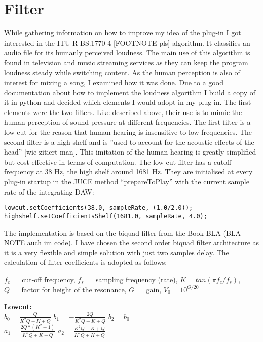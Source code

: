 \section{Filter}

While gathering information on how to improve my idea of the plug-in I got interested in the ITU-R BS.1770-4 [FOOTNOTE pls] algorithm. It classifies an audio file for its humanly perceived loudness. The main use of this algorithm is found in television and music streaming services as they can keep the program loudness steady while switching content. As the human perception is also of interest for mixing a song, I examined how it was done. Due to a good documentation about how to implement the loudness algorithm I build a copy of it in python and decided which elements I would adopt in my plug-in. The first elements were the two filters. Like described above, their use is to mimic the human perception of sound pressure at different frequencies. The first filter is a low cut for the reason that human hearing is insensitive to low frequencies. The second filter is a high shelf and is ”used to account for the acoustic effects of the head” [wie zitiert man]. This imitation of the human hearing is greatly simplified but cost effective in terms of computation. The low cut filter has a cutoff frequency at 38 Hz, the high shelf around 1681 Hz. They are initialised at every plug-in startup in the JUCE method “prepareToPlay” with the current sample rate of the integrating DAW:\\

\lstset{language=C++}
\begin{lstlisting}[frame=single]
lowcut.setCoefficients(38.0, sampleRate, (1.0/2.0));
highshelf.setCoefficientsShelf(1681.0, sampleRate, 4.0);
\end{lstlisting}

The implementation is based on the biquad filter from the Book BLA (BLA NOTE auch im code).  I have chosen the second order biquad filter architecture as it is a very flexible and simple solution with just two samples delay. The calculation of filter coefficients is adopted as follows:

$f_c = $ cut-off frequency, $f_s = $ sampling frequency (rate), $K = tan(\pi f_{c}/f_{s})$,\\
$Q = $ factor for height of the resonance, $G = $ gain, $V_0 = 10^{G/20}$

\textbf{Lowcut:}\\
$b_0 = \frac{Q}{K^{2}Q+K+Q}$ \tab $b_1 = -\frac{2Q}{K^{2}Q+K+Q}$ \tab $b_2 = b_0$\\
$a_1 = \frac{2Q*(K^{2}-1)}{K^{2}Q+K+Q}$ \tab $a_2 = \frac{K^{2}Q-K+Q}{K^{2}Q+K+Q}$

